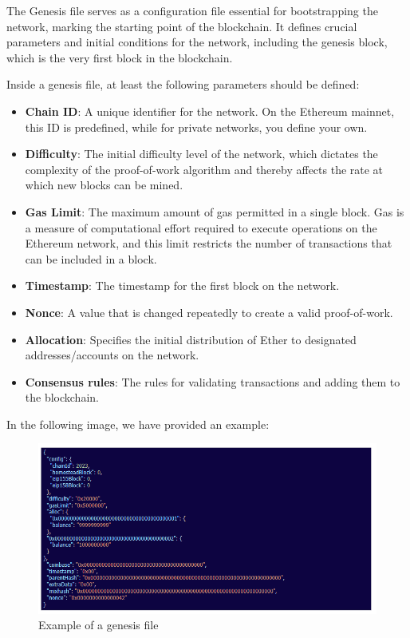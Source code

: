 The Genesis file serves as a configuration file essential for bootstrapping the network, marking the starting point of the blockchain. It defines crucial parameters and initial conditions for the network, including the genesis block, which is the very first block in the blockchain. 

Inside a genesis file, at least the following parameters should be defined:
\begin{itemize}
    \item \textbf{Chain ID}: A unique identifier for the network. On the Ethereum mainnet, this ID is predefined, while for private networks, you define your own.
    \item \textbf{Difficulty}: The initial difficulty level of the network, which dictates the complexity of the proof-of-work algorithm and thereby affects the rate at which new blocks can be mined.
    \item \textbf{Gas Limit}: The maximum amount of gas permitted in a single block. Gas is a measure of computational effort required to execute operations on the Ethereum network, and this limit restricts the number of transactions that can be included in a block.
    \item \textbf{Timestamp}: The timestamp for the first block on the network.
    \item \textbf{Nonce}: A value that is changed repeatedly to create a valid proof-of-work.
    \item \textbf{Allocation}: Specifies the initial distribution of Ether to designated addresses/accounts on the network.
    \item \textbf{Consensus rules}: The rules for validating transactions and adding them to the blockchain.
\end{itemize}

In the following image, we have provided an example:

\begin{figure}[ht]
    \centering
    \includegraphics[width=0.75\linewidth]{tikz/appendix - Genesis File.png}
    \caption{Example of a genesis file}
    \label{fig:genesis-file}
\end{figure}

